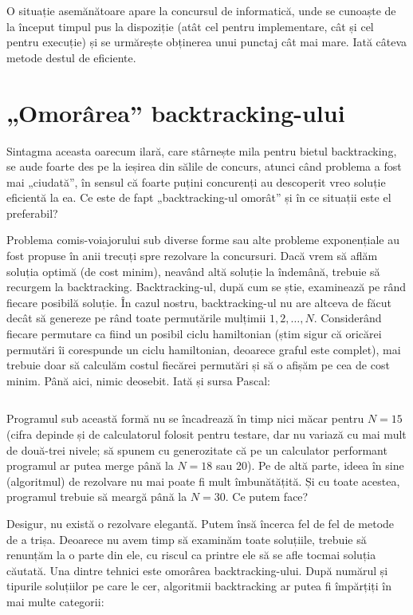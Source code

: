 O situație asemănătoare apare la concursul de informatică, unde se cunoaște de
la început timpul pus la dispoziție (atât cel pentru implementare, cât și cel
pentru execuție) și se urmărește obținerea unui punctaj cât mai mare. Iată
câteva metode destul de eficiente.

\section{„Omorârea” backtracking-ului}

Sintagma aceasta oarecum ilară, care stârnește mila pentru bietul
backtracking, se aude foarte des pe la ieșirea din sălile de concurs, atunci
când problema a fost mai „ciudată”, în sensul că foarte puțini concurenți au
descoperit vreo soluție eficientă la ea. Ce este de fapt „backtracking-ul
omorât” și în ce situații este el preferabil?

Problema comis-voiajorului sub diverse forme sau alte probleme exponențiale au
fost propuse în anii trecuți spre rezolvare la concursuri. Dacă vrem să aflăm
soluția optimă (de cost minim), neavând altă soluție la îndemână, trebuie să
recurgem la backtracking. Backtracking-ul, după cum se știe, examinează pe
rând fiecare posibilă soluție. În cazul nostru, backtracking-ul nu are altceva
de făcut decât să genereze pe rând toate permutările mulțimii ${1, 2, \dots,
  N}$. Considerând fiecare permutare ca fiind un posibil ciclu hamiltonian
(știm sigur că oricărei permutări îi corespunde un ciclu hamiltonian, deoarece
graful este complet), mai trebuie doar să calculăm costul fiecărei permutări
și să o afișăm pe cea de cost minim. Până aici, nimic deosebit. Iată și sursa
Pascal:

\inputminted{pascal}{src/chapter5-1.pas}

Programul sub această formă nu se încadrează în timp nici măcar pentru $N=15$
(cifra depinde și de calculatorul folosit pentru testare, dar nu variază cu
mai mult de două-trei nivele; să spunem cu generozitate că pe un calculator
performant programul ar putea merge până la $N=18$ sau 20). Pe de altă parte,
ideea în sine (algoritmul) de rezolvare nu mai poate fi mult îmbunătățită. Și
cu toate acestea, programul trebuie să meargă până la $N=30$. Ce putem face?

Desigur, nu există o rezolvare elegantă. Putem însă încerca fel de fel de
metode de a trișa. Deoarece nu avem timp să examinăm toate soluțiile, trebuie
să renunțăm la o parte din ele, cu riscul ca printre ele să se afle tocmai
soluția căutată. Una dintre tehnici este omorârea backtracking-ului. După
numărul și tipurile soluțiilor pe care le cer, algoritmii backtracking ar
putea fi împărțiți în mai multe categorii:

